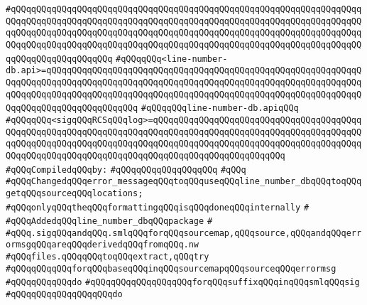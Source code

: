 \verb|#qQQqqQQqqQQqqQQqqQQqqQQqqQQqqQQqqQQqqQQqqQQqqQQqqQQqqQQqqQQqqQQqqQQqqQQqqQQqqQQqqQQqqQQqqQQqqQQqqQQqqQQqqQQqqQQqqQQqqQQqqQQqqQQqqQQqqQQqqQQqqQQqqQQqqQQqqQQqqQQqqQQqqQQqqQQqqQQqqQQqqQQqqQQqqQQqqQQqqQQqqQQqqQQqqQQqqQQqqQQqqQQqqQQqqQQqqQQqqQQqqQQqqQQqqQQqqQQqqQQqqQQqqQQqqQQqqQQqqQQqqQQqqQQqqQQqqQQqqQQq|\newline
\verb|#qQQqqQQq<line-number-db.api>=qQQqqQQqqQQqqQQqqQQqqQQqqQQqqQQqqQQqqQQqqQQqqQQqqQQqqQQqqQQqqQQqqQQqqQQqqQQqqQQqqQQqqQQqqQQqqQQqqQQqqQQqqQQqqQQqqQQqqQQqqQQqqQQqqQQqqQQqqQQqqQQqqQQqqQQqqQQqqQQqqQQqqQQqqQQqqQQqqQQqqQQqqQQqqQQqqQQqqQQqqQQqqQQqqQQqqQQqqQQqqQQqqQQq|\newline
\verb|#qQQqqQQqline-number-db.apiqQQq|\newline
\verb|#qQQqqQQq<sigqQQqRCSqQQqlog>=qQQqqQQqqQQqqQQqqQQqqQQqqQQqqQQqqQQqqQQqqQQqqQQqqQQqqQQqqQQqqQQqqQQqqQQqqQQqqQQqqQQqqQQqqQQqqQQqqQQqqQQqqQQqqQQqqQQqqQQqqQQqqQQqqQQqqQQqqQQqqQQqqQQqqQQqqQQqqQQqqQQqqQQqqQQqqQQqqQQqqQQqqQQqqQQqqQQqqQQqqQQqqQQqqQQqqQQqqQQqqQQqqQQqqQQqqQQq|\newline
\newline
\verb|#qQQqCompiledqQQqby:|\newline
\verb|#qQQqqQQqqQQqqQQqqQQq|\newline
\newline
\verb|#qQQq|\newline
\verb|#qQQqChangedqQQqerror_messageqQQqtoqQQquseqQQqline_number_dbqQQqtoqQQqgetqQQqsourceqQQqlocations;|\newline
\verb|#qQQqonlyqQQqtheqQQqformattingqQQqisqQQqdoneqQQqinternally|\newline
\verb|#|\newline
\verb|#qQQqAddedqQQqline_number_dbqQQqpackage|\newline
\verb|#|\newline
\verb|#qQQq.sigqQQqandqQQq.smlqQQqforqQQqsourcemap,qQQqsource,qQQqandqQQqerrormsgqQQqareqQQqderivedqQQqfromqQQq.nw|\newline
\verb|#qQQqfiles.qQQqqQQqtoqQQqextract,qQQqtry|\newline
\verb|#qQQqqQQqqQQqforqQQqbaseqQQqinqQQqsourcemapqQQqsourceqQQqerrormsg|\newline
\verb|#qQQqqQQqqQQqdo|\newline
\verb|#qQQqqQQqqQQqqQQqqQQqforqQQqsuffixqQQqinqQQqsmlqQQqsig|\newline
\verb|#qQQqqQQqqQQqqQQqqQQqdo|\newline
